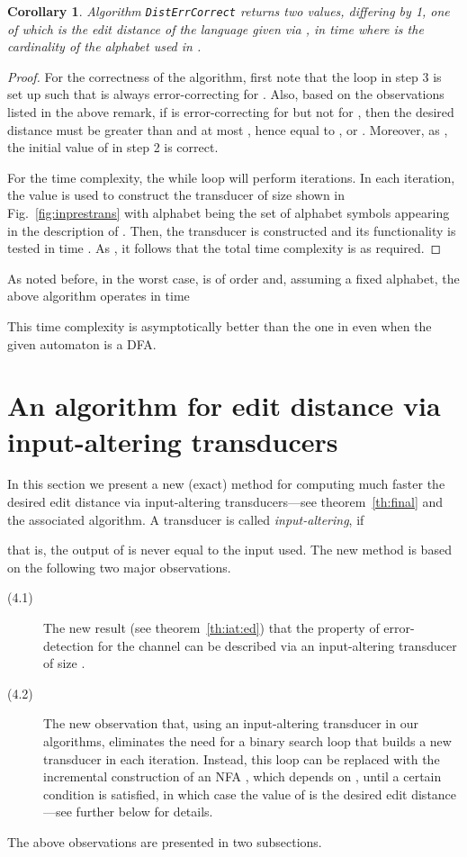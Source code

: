 \documentclass{article}
\theoremstyle{plain}
\newtheorem{corollary}[theorem]{Corollary}
\theoremstyle{definition}
\theoremstyle{remark}
\newcommand\pnsi{\par\indent}
\begin{document}
\begin{corollary}\label{cor:ec}
Algorithm \texttt{DistErrCorrect} returns
two values, differing by 1, one of which is the edit distance of
the language given via , in time   
where  is the cardinality of the alphabet used in .
\end{corollary}
\begin{proof}
For the correctness of the algorithm, first note that the loop in step 3 is set up such that 
is always error-correcting for . Also, based on the observations listed in the above remark, if  is error-correcting for  but not for
, then the desired distance
must be greater than  and at most , hence equal
to , or . Moreover, as ,
the initial value of  in step 2 is correct.
\pnsi
For the time complexity, the while loop will
perform  iterations. In each
iteration, the value  is
used to construct the transducer of
size  shown in Fig.~\ref{fig:inprestrans} with alphabet
being the set of alphabet symbols appearing
in the description of . Then, the transducer
 is constructed and its functionality
is tested in time .
As , it follows that the total time complexity is
as required.
\end{proof}
As noted before, in the worst case,  is
of order  and, assuming a fixed alphabet, the above algorithm operates in time

This time complexity is asymptotically better than the one in \cite{Kon:2007} even when the given automaton is a DFA.



\section{An  algorithm for edit distance via input-altering transducers}\label{sec:iat}
In this section we present a new (exact) method for computing much faster the desired edit distance via input-altering transducers---see theorem~\ref{th:final} and the associated algorithm.
A transducer  is called \emph{input-altering}, if

that is, the output of  is never equal to the input used. The new method is based on the following two major observations.
\begin{description}
  \item[(4.1)] The new result (see theorem~\ref{th:iat:ed}) that the property of error-detection for the channel  can be described via an input-altering transducer  of size .
  \item[(4.2)] The new observation that, using an input-altering transducer in our algorithms, eliminates the need for a binary search loop that builds a new transducer in each iteration. Instead, this loop can be replaced with the incremental construction of an NFA , which depends on , until a certain condition is satisfied, in which case the value of  is the desired edit distance---see further below for details.
\end{description}
The above observations are presented in two subsections.
\end{document}
